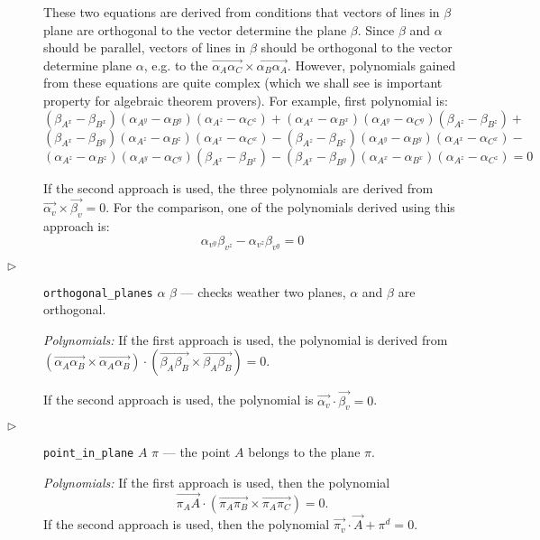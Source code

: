 \documentclass[final,1p,times,authoryear]{elsarticle}
\begin{document}
\begin{description}
These two equations are derived from conditions that vectors of lines
in $\beta$ plane are orthogonal to the vector determine the plane
$\beta$. Since $\beta$ and $\alpha$ should be parallel, vectors of
lines in $\beta$ should be orthogonal to the vector determine plane
$\alpha$, e.g. to the $\overrightarrow{\alpha_A\alpha_C} \times
\overrightarrow{\alpha_B\alpha_A}$. However, polynomials gained from
these equations are quite complex (which we shall see is important
property for algebraic theorem provers). For example, first polynomial
is:
$$(\beta_{A^x} - \beta_{B^x})(\alpha_{A^y} - \alpha_{B^y})(\alpha_{A^z} - \alpha_{C^z}) + (\alpha_{A^x} - \alpha_{B^x})(\alpha_{A^y} - \alpha_{C^y})(\beta_{A^z} - \beta_{B^z}) +$$
$$(\beta_{A^x} - \beta_{B^y})(\alpha_{A^z} - \alpha_{B^z})(\alpha_{A^x} - \alpha_{C^x}) - (\beta_{A^z} - \beta_{B^z})(\alpha_{A^y} - \alpha_{B^y})(\alpha_{A^x} - \alpha_{C^x}) -$$
$$(\alpha_{A^z} - \alpha_{B^z})(\alpha_{A^y} - \alpha_{C^y})(\beta_{A^x} - \beta_{B^x}) - (\beta_{A^x} - \beta_{B^y})(\alpha_{A^x} - \alpha_{B^x})(\alpha_{A^z} - \alpha_{C^z}) = 0$$

If the second approach is used, the three polynomials are derived from
$\overrightarrow{\alpha_v} \times \overrightarrow{\beta_v} = 0.$
For the comparison, one of the polynomials derived using this approach is:
$$\alpha_{v^y}\beta_{v^z} - \alpha_{v^z}\beta_{v^y} = 0$$


\item[$\triangleright$] {\tt orthogonal\_planes} $\alpha$ $\beta$ ---
  checks weather two planes, $\alpha$ and $\beta$ are orthogonal.

{\em Polynomials:} If the first approach is used, the polynomial is
derived from $(\overrightarrow{\alpha_A\alpha_B} \times
\overrightarrow{\alpha_A\alpha_B}) \cdot
(\overrightarrow{\beta_A\beta_B} \times
\overrightarrow{\beta_A\beta_B}) = 0$.

If the second approach is used, the polynomial is
$\overrightarrow{\alpha_v} \cdot \overrightarrow{\beta_v} = 0$.

\item[$\triangleright$] {\tt point\_in\_plane} $A$ $\pi$ --- the point
  $A$ belongs to the plane $\pi$.

{\em Polynomials:} If the first approach is used, then the polynomial
$$\overrightarrow{\pi_AA}\cdot (\overrightarrow{\pi_A\pi_B} \times \overrightarrow{\pi_A\pi_C}) = 0.$$
If the second approach is used, then the polynomial
$\overrightarrow{\pi_v} \cdot \overrightarrow{A} + \pi^{d} = 0$.


\end{description}
\end{document}
